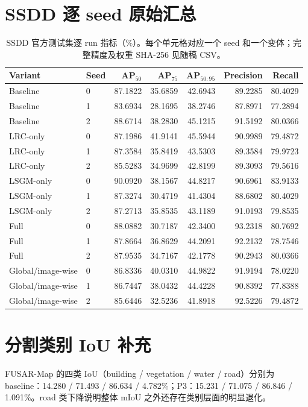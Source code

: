 \documentclass[UTF8,12pt,a4paper]{ctexart}
\begin{document}
\appendix
\section{SSDD 逐 seed 原始汇总}
\begin{table}[H]\centering\scriptsize
\caption{SSDD 官方测试集逐 run 指标（\%）。每个单元格对应一个 seed 和一个变体；完整精度及权重 SHA-256 见随稿 CSV。}
\begin{tabular}{llrrrrr}
\toprule
Variant & Seed & AP$_{50}$ & AP$_{75}$ & AP$_{50:95}$ & Precision & Recall\\
\midrule
Baseline & 0 & 87.1822 & 35.6859 & 42.6943 & 89.2285 & 80.4029\\
Baseline & 1 & 83.6934 & 28.1695 & 38.2746 & 87.8971 & 77.2894\\
Baseline & 2 & 88.6714 & 38.2830 & 45.1215 & 91.5192 & 80.0366\\
LRC-only & 0 & 87.1986 & 41.9141 & 45.5944 & 90.9989 & 79.4872\\
LRC-only & 1 & 87.3584 & 35.8419 & 43.5303 & 89.3584 & 79.9723\\
LRC-only & 2 & 85.5283 & 34.9699 & 42.8199 & 89.3093 & 79.5616\\
LSGM-only & 0 & 90.0920 & 38.1567 & 44.8217 & 90.6961 & 83.9133\\
LSGM-only & 1 & 87.3274 & 30.4719 & 41.4304 & 88.6802 & 80.4029\\
LSGM-only & 2 & 87.2713 & 35.8535 & 43.1189 & 91.0193 & 79.8535\\
Full & 0 & 88.0882 & 30.7187 & 42.3400 & 93.2318 & 80.7692\\
Full & 1 & 87.8664 & 36.8629 & 44.2091 & 92.2132 & 78.7546\\
Full & 2 & 87.9535 & 34.7167 & 42.1778 & 90.2943 & 80.0366\\
Global/image-wise & 0 & 86.8336 & 40.0310 & 44.9822 & 91.9194 & 78.0220\\
Global/image-wise & 1 & 86.7447 & 38.0432 & 44.4228 & 90.8392 & 77.8388\\
Global/image-wise & 2 & 85.6446 & 32.5236 & 41.8918 & 92.5226 & 79.4872\\
\bottomrule
\end{tabular}
\end{table}

\section{分割类别 IoU 补充}
FUSAR-Map 的四类 IoU（building / vegetation / water / road）分别为 baseline：14.280 / 71.493 / 86.634 / 4.782\%；P3：15.231 / 71.075 / 86.846 / 1.091\%。road 类下降说明整体 mIoU 之外还存在类别层面的明显退化。
\end{document}
